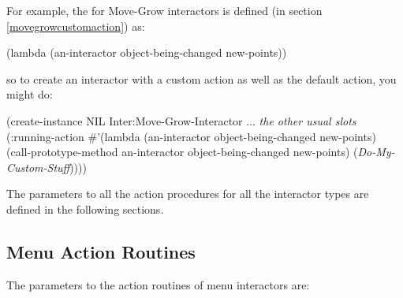 For example, the  for Move-Grow interactors is defined
(in section \ref{movegrowcustomaction}) as:
\begin{programexample}
(lambda (an-interactor object-being-changed new-points))
\end{programexample}
so to create an interactor with a custom action as well as the default
action, you might do:
\label{movegrowexample3}
\begin{programexample}
(create-instance NIL Inter:Move-Grow-Interactor
   ... {\it the other usual slots}
   (:running-action
    \#'(lambda (an-interactor object-being-changed new-points)
	(call-prototype-method an-interactor object-being-changed new-points)
	({\it Do-My-Custom-Stuff}))))
\end{programexample}

The parameters to all the action procedures for all the interactor types
are defined in the following sections.

\subsection{Menu Action Routines}
\label{Menucustomaction}

The parameters to the action routines of menu interactors are:

